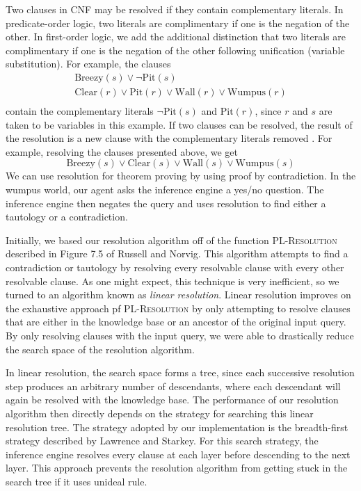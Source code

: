 \documentclass{article}
\begin{document}
Two clauses in CNF may be resolved if they contain complementary literals. In predicate-order logic, two literals are complimentary if one is the negation of the other. 
In first-order logic, we add the additional distinction that two literals are complimentary if one is the negation of the other following unification (variable substitution)\cite{ai}. 
For example, the clauses
\begin{gather*}
\text{Breezy}(s) \lor \neg \text{Pit}(s) \\
\text{Clear}(r) \lor \text{Pit}(r) \lor \text{Wall}(r) \lor \text{Wumpus}(r) \\
\end{gather*}
contain the complementary literals $\neg \text{Pit}(s)$ and $\text{Pit}(r)$, since $r$ and $s$ are taken to be variables in this example. 
If two clauses can be resolved, the result of the resolution is a new clause with the complementary literals removed \cite{ai}. 
For example, resolving the clauses presented above, we get
\begin{equation*}
\text{Breezy}(s) \lor \text{Clear}(s) \lor \text{Wall}(s) \lor \text{Wumpus}(s)
\end{equation*}
We can use resolution for theorem proving by using proof by contradiction. 
In the wumpus world, our agent asks the inference engine a yes/no question.
The inference engine then negates the query and uses resolution to find either a tautology or a contradiction.

Initially, we based our resolution algorithm off of the function \textsc{PL-Resolution} described in Figure 7.5 of Russell and Norvig. 
This algorithm attempts to find a contradiction or tautology by resolving every resolvable clause with every other resolvable clause. 
As one might expect, this technique is very inefficient, so we turned to an algorithm known as \textit{linear resolution}. 
Linear resolution improves on the exhaustive approach pf \textsc{PL-Resolution} by only attempting to resolve clauses that are either in the knowledge base or an ancestor of the original input query\cite{ai}. 
By only resolving clauses with the input query, we were able to drastically reduce the search space of the resolution algorithm.

In linear resolution, the search space forms a tree, since each successive resolution step produces an arbitrary number of descendants, where each descendant will again be resolved with the knowledge base. 
The performance of our resolution algorithm then directly depends on the strategy for searching this linear resolution tree. 
The strategy adopted by our implementation is the breadth-first strategy described by Lawrence and Starkey. 
For this search strategy, the inference engine resolves every clause at each layer before descending to the next layer. 
This approach prevents the resolution algorithm from getting stuck in the search tree if it uses unideal rule.
\end{document}
